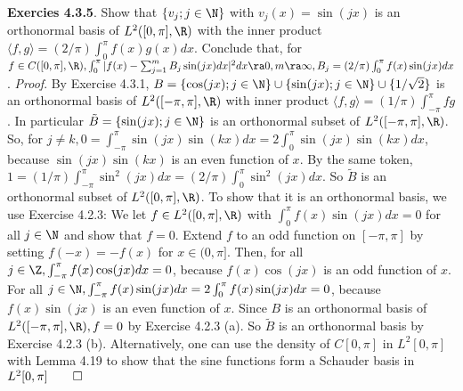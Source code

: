 {\bf Exercies 4.3.5}. Show that $\{v_j;j\in\N\}$ with $v_j(x)=\sin(jx)$ is an orthonormal basis of $L^2([0,\pi],\R)$ with the inner product $\langle f,g \rangle =(2/\pi)\int_0^{\pi}f(x)g(x)dx$. Conclude that, for $f \in C([0,\pi],\R), \int_0^{\pi}|f(x)-\sum_{j=1}^mB_j\sin(jx)dx|^2dx \ra 0, m\ra \infty, B_j=(2/\pi)\int_0^{\pi}f(x)\sin(jx)dx$. {\it Proof}. By Exercise 4.3.1, $B=\{\cos(jx);j\in\N\}\cup \{\sin(jx);j\in\N\}\cup \{1/\sqrt{2}\}$ is an orthonormal basis of $L^2([-\pi,\pi],\R)$ with inner product $\langle f,g \rangle = (1/\pi)\int_{-\pi}^{\pi}fg$. In particular $\tilde{B} = \{\sin(jx);j\in\N\}$ is an orthonormal subset of $L^2([-\pi,\pi],\R)$. So, for $j \neq k, 0 = \int_{-\pi}^{\pi}\sin(jx)\sin(kx)dx=2\int_0^{\pi}\sin(jx)\sin(kx)dx$, because $\sin(jx)\sin(kx)$ is an even function of $x$. By the same token, $1 = (1/\pi)\int_{-\pi}^{\pi}\sin^2(jx)dx= (2/\pi)\int_0^{\pi}\sin^2(jx)dx$. So $\tilde{B}$ is an orthonormal subset of $L^2([0,\pi], \R)$. To show that it is an orthonormal basis, we use Exercise 4.2.3:  We let $f \in L^2([0,\pi], \R)$ with $\int_0^{\pi}f(x)\sin(jx)dx=0$ for all $j \in \N$ and show that $f=0$. Extend $f$ to an odd function on $[-\pi,\pi]$ by setting $f(-x)=-f(x)$ for $x \in (0,\pi]$. Then, for all $j \in \Z, \int_{-\pi}^{\pi}f(x)\cos(jx)dx=0$, because $f(x)\cos(jx)$ is an odd function of $x$. For all $j \in \N, \int_{-\pi}^{\pi}f(x)\sin(jx)dx=2\int_0^{\pi}f(x)\sin(jx)dx=0$, because $f(x)\sin(jx)$ is an even function of $x$. Since $B$ is an orthonormal basis of $L^2([-\pi,\pi],\R), f=0$ by Exercise 4.2.3 (a). So $\tilde{B}$ is an orthonormal basis by Exercise 4.2.3 (b).  Alternatively, one can use the density of $C[0,\pi]$ in $L^2[0,\pi]$ with Lemma 4.19 to show that the sine functions form a Schauder basis in $L^2[0,\pi] \qed$